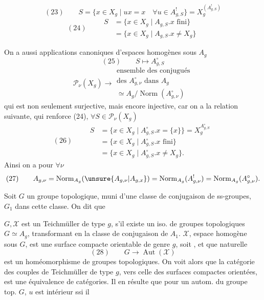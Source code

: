 \[
(23)\qquad S=\{x\in X_g\mid ux=x\quad\forall u\in A_{g,S}^!\}
=X_g^{(A_{g,S}^!)}
\]
\[
(24)\qquad\begin{aligned}
S&=\{x\in X_g\mid A_{g,S}.x\text{ fini}\}\\
 &=\{x\in X_g\mid A_{g,S}.x\ne X_g\}
\end{aligned}
\]

On a aussi  applications canoniques
d'espaces homogènes sous $A_g$
\[
(25)\qquad S\longmapsto A_{g,S}^{\circ}
\]
\[
\mathcal P_\nu(X_g)\longrightarrow
\begin{gathered}
\text{ensemble des conjugués}\\
\text{des }A_{g,\nu}^{\circ}\text{ dans }A_g\\
\simeq A_g/\operatorname{Norm}(A_{g,\nu}^{\circ})
\end{gathered}
\]
qui est non seulement surjective, mais encore
injective, car on a la relation suivante, qui
renforce  (24), $\forall S\in\mathcal P_\nu(X_g)$
\[
(26)\qquad\begin{aligned}
S&=\{x\in X_g\mid A_{g,S}^{\circ}.x=\{x\}\}=X_g^{A_{g,S}^{\circ}}\\
 &=\{x\in X_g\mid A_{g,S}^{\circ}.x\text{ fini}\}\\
 &=\{x\in X_g\mid A_{g,S}^{\circ}.x\ne X_g\}.
\end{aligned}
\]
 Ainsi on a pour $\forall\nu$
\[
(27)\qquad A_{g,\nu}=\operatorname{Norm}_{A_g}(\unsure{A_{g,\nu}|A_{g,x}})
=\operatorname{Norm}_{A_g}(A_{g,\nu}^!)=\operatorname{Norm}_{A_g}(A_{g,\nu}^{\circ}).
\]

Soit $G$ un groupe topologique, muni
d'une classe de conjugaison  de ss-groupes,
 $G_1$ dans cette classe. On dit que

$G,\mathcal X$ est un   Teichmüller
de type $g$, s'il existe un iso. de groupes
topologiques $G\simeq A_g$, transformant
 en la classe de conjugaison de $A_1$.
 $\mathcal X$, 
espace homogène
sous $G$, est  une
surface compacte orientable de genre $g$,
 soit , et que
 
naturelle
\[
(28)\qquad G\longrightarrow\operatorname{Aut}(\mathcal X)
\]
est un homéomorphisme de groupes topologiques.
On voit alors que 
la catégorie des
couples de Teichmüller de type $g$, vers
celle des surfaces compactes orientées, est
une équivalence de catégories. Il en résulte
que  pour un autom.  du
groupe top. $G$, $u$ est intérieur ssi il

